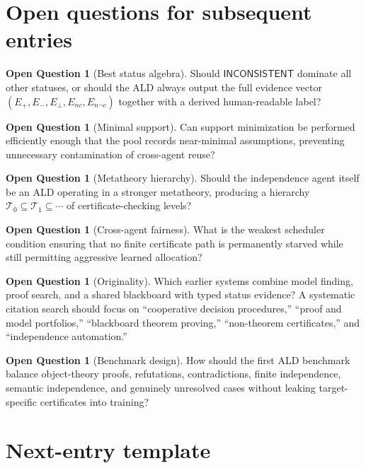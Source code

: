 \documentclass[11pt]{article}
\theoremstyle{definition}
\newtheorem{question}[theorem]{Open Question}
\theoremstyle{remark}
\newcommand{\T}{\mathcal T}
\newcommand{\Inc}{\mathsf{INCONSISTENT}}
\begin{document}
\section{Open questions for subsequent entries}

\begin{question}[Best status algebra]
Should $\Inc$ dominate all other statuses, or should the ALD always output the full evidence vector $(E_{+},E_{-},E_{\bot},E_{nc},E_{n\neg c})$ together with a derived human-readable label?
\end{question}

\begin{question}[Minimal support]
Can support minimization be performed efficiently enough that the pool records near-minimal assumptions, preventing unnecessary contamination of cross-agent reuse?
\end{question}

\begin{question}[Metatheory hierarchy]
Should the independence agent itself be an ALD operating in a stronger metatheory, producing a hierarchy $\T_0\subseteq\T_1\subseteq\cdots$ of certificate-checking levels?
\end{question}

\begin{question}[Cross-agent fairness]
What is the weakest scheduler condition ensuring that no finite certificate path is permanently starved while still permitting aggressive learned allocation?
\end{question}

\begin{question}[Originality]
Which earlier systems combine model finding, proof search, and a shared blackboard with typed status evidence? A systematic citation search should focus on ``cooperative decision procedures,'' ``proof and model portfolios,'' ``blackboard theorem proving,'' ``non-theorem certificates,'' and ``independence automation.''
\end{question}

\begin{question}[Benchmark design]
How should the first ALD benchmark balance object-theory proofs, refutations, contradictions, finite independence, semantic independence, and genuinely unresolved cases without leaking target-specific certificates into training?
\end{question}

\section{Next-entry template}
\end{document}
